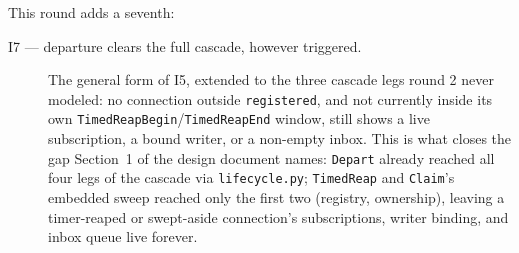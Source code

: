 \documentclass[a4paper,10pt,fleqn]{article}
\begin{document}
This round adds a seventh:

\begin{description}
  \item[I7 --- departure clears the full cascade, however triggered.] The
    general form of I5, extended to the three cascade legs round 2 never
    modeled: no connection outside \texttt{registered}, and not currently
    inside its own \texttt{TimedReapBegin}/\texttt{TimedReapEnd} window,
    still shows a live subscription, a bound writer, or a non-empty
    inbox. This is what closes the gap Section~1 of the design document
    names: \texttt{Depart} already reached all four legs of the cascade
    via \texttt{lifecycle.py}; \texttt{TimedReap} and \texttt{Claim}'s
    embedded sweep reached only the first two (registry, ownership),
    leaving a timer-reaped or swept-aside connection's subscriptions,
    writer binding, and inbox queue live forever.
\end{description}
\end{document}
